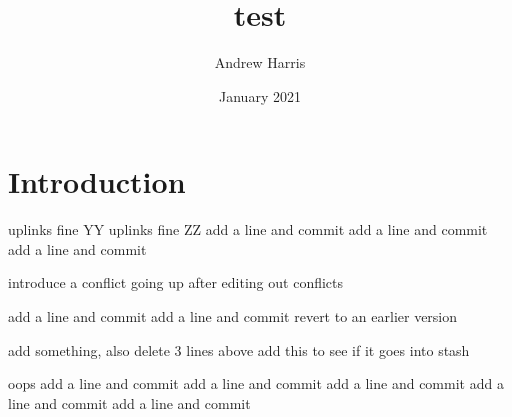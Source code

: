 \documentclass{article}
\title{test}
\author{Andrew Harris}
\date{January 2021}
\begin{document}
\maketitle

\section{Introduction}
uplinks fine YY
uplinks fine ZZ
add a line and commit
add a line and commit
add a line and commit

introduce a conflict going up
after editing out conflicts

add a line and commit
add a line and commit
revert to an earlier version

add something, also delete 3 lines above
add this to see if it goes into stash

oops
add a line and commit
add a line and commit
add a line and commit
add a line and commit
add a line and commit
\end{document}
